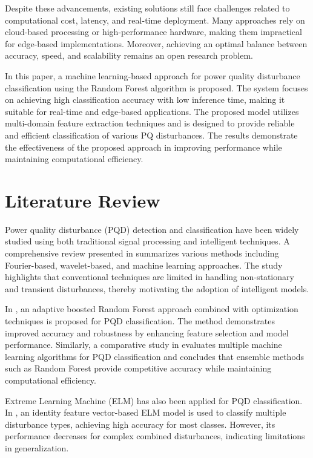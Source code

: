 \documentclass[conference]{IEEEtran}
\begin{document}
Despite these advancements, existing solutions still face challenges related to computational cost, latency, and real-time deployment. Many approaches rely on cloud-based processing or high-performance hardware, making them impractical for edge-based implementations. Moreover, achieving an optimal balance between accuracy, speed, and scalability remains an open research problem.

In this paper, a machine learning-based approach for power quality disturbance classification using the Random Forest algorithm is proposed. The system focuses on achieving high classification accuracy with low inference time, making it suitable for real-time and edge-based applications. The proposed model utilizes multi-domain feature extraction techniques and is designed to provide reliable and efficient classification of various PQ disturbances. The results demonstrate the effectiveness of the proposed approach in improving performance while maintaining computational efficiency. 

\section{Literature Review}

Power quality disturbance (PQD) detection and classification have been widely studied using both traditional signal processing and intelligent techniques. A comprehensive review presented in \cite{b1} summarizes various methods including Fourier-based, wavelet-based, and machine learning approaches. The study highlights that conventional techniques are limited in handling non-stationary and transient disturbances, thereby motivating the adoption of intelligent models.

In \cite{b2}, an adaptive boosted Random Forest approach combined with optimization techniques is proposed for PQD classification. The method demonstrates improved accuracy and robustness by enhancing feature selection and model performance. Similarly, a comparative study in \cite{b5} evaluates multiple machine learning algorithms for PQD classification and concludes that ensemble methods such as Random Forest provide competitive accuracy while maintaining computational efficiency.

Extreme Learning Machine (ELM) has also been applied for PQD classification. In \cite{b3}, an identity feature vector-based ELM model is used to classify multiple disturbance types, achieving high accuracy for most classes. However, its performance decreases for complex combined disturbances, indicating limitations in generalization.
\end{document}
